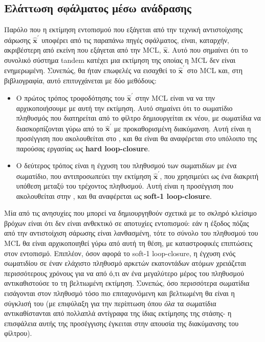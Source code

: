 \subsection{Ελάττωση σφάλματος μέσω ανάδρασης}


Παρόλο που η εκτίμηση εντοπισμού που εξάγεται από την τεχνική αντιστοίχισης σάρωσης
$\hat{\bm{x}}^{\prime}$ υποφέρει από τις παραπάνω πηγές σφάλματος, είναι,
καταρχήν, ακριβέστερη από εκείνη που εξάγεται από την MCL, $\bm{\hat{x}}$. Αυτό που
σημαίνει ότι το συνολικό σύστημα tandem κατέχει μια εκτίμηση της οποίας η MCL δεν είναι
ενημερωμένη. Συνεπώς, θα ήταν επωφελές να εισαχθεί το $\hat{\bm{x}}^{\prime}$ στο
MCL και, στη βιβλιογραφία, αυτό επιτυγχάνεται με δύο μεθόδους:

\begin{itemize}
  \item Ο πρώτος τρόπος τροφοδότησης του $\hat{\bm{x}}^{\prime}$ στην MCL είναι να
        να την αρχικοποιήσουμε με αυτή την εκτίμηση. Αυτό σημαίνει ότι το σωματίδιο
        πληθυσμός που διατηρείται από το φίλτρο δημιουργείται εκ νέου, με σωματίδια
        να διασκορπίζονται γύρω από το $\hat{\bm{x}}^{\prime}$ με προκαθορισμένη διακύμανση.
        Αυτή είναι η προσέγγιση που ακολουθείται στο \cite{paid_original}, και θα είναι
        θα αναφέρεται στο υπόλοιπο της παρούσας εργασίας ως \textbf{hard loop-closure}.
  \item Ο δεύτερος τρόπος είναι η έγχυση του πληθυσμού των σωματιδίων με ένα σωματίδιο,
        που αντιπροσωπεύει την εκτίμηση $\hat{\bm{x}}^{\prime}$, που χρησιμεύει ως ένα
        διακριτή υπόθεση μεταξύ του τρέχοντος πληθυσμού. Αυτή είναι η προσέγγιση
        που ακολουθείται στην \cite{gangpeng}, και θα αναφέρεται ως \textbf{soft-1
        loop-closure}.
\end{itemize}

Μία από τις ανησυχίες που μπορεί να δημιουργηθούν σχετικά με το σκληρό κλείσιμο βρόχων είναι
ότι δεν είναι ανθεκτικό σε αποτυχίες εντοπισμού: εάν η έξοδος πόζας
από την αντιστοίχιση σάρωσης είναι λανθασμένη, τότε το σύνολο του πληθυσμού του MCL θα είναι
αρχικοποιηθεί γύρω από αυτή τη θέση, με καταστροφικές επιπτώσεις στον εντοπισμό.
Επιπλέον, όσον αφορά το soft-1 loop-closure, η έγχυση ενός
σωματιδίου σε έναν ελάχιστο πληθυσμό αρκετών εκατοντάδων ατόμων χρειάζεται περισσότερους χρόνους για να
από ό,τι αν ένα μεγαλύτερο μέρος του πληθυσμού αντικαθιστούσε το
τη βελτιωμένη εκτίμηση. Συνεπώς, όσο περισσότερα σωματίδια εισάγονται στον πληθυσμό
τόσο πιο επιταχυνόμενη και βελτιωμένη θα είναι η σύγκλισή του (με επιφύλαξη
για την περίπτωση όπου \textit{όλα} τα σωματίδια αντικαθίστανται από πολλαπλά αντίγραφα
της ίδιας εκτίμησης της στάσης- η επισφάλεια αυτής της προσέγγισης έγκειται στην
απουσία της διακύμανσης του φίλτρου).

